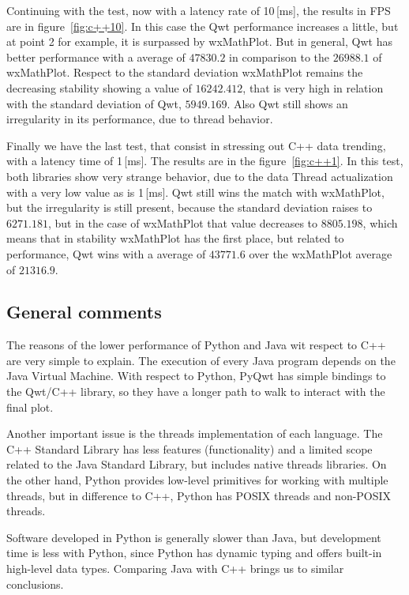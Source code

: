 Continuing with the test, now with a latency rate of 10\,[ms],
the results in FPS are in figure~\ref{fig:c++10}.
In this case the Qwt performance increases a little, but at
point 2 for example, it is surpassed by wxMathPlot. But in general,
Qwt has better performance with a average of $47830.2$ in
comparison to the $26988.1$ of wxMathPlot.
Respect to the standard deviation wxMathPlot remains the
decreasing stability showing a value of $16242.412$,
that is very high in relation with the standard deviation of
Qwt, $5949.169$. Also Qwt still shows an irregularity
in its performance, due to thread behavior.

Finally we have the last test, that consist in stressing out C++ data trending, with a latency time of 1\,[ms].
The results are in the figure~\ref{fig:c++1}.
In this test, both libraries show very strange behavior, due to the
data Thread actualization with a very low value as is 1\,[ms].
Qwt still wins the match with wxMathPlot, but the irregularity is still present,
because the standard deviation raises to $6271.181$, but in the case of wxMathPlot
that value decreases to $8805.198$, which means that in stability wxMathPlot has the
first place, but related to performance, Qwt wins with a average of $43771.6$
over the wxMathPlot average of $21316.9$.


\subsection{General comments}

The reasons of the lower performance of Python and Java wit respect to C++
are very simple to explain. The execution of every Java program depends on the
Java Virtual Machine.
With respect to Python, PyQwt has simple bindings to the Qwt/C++ library, so they
have a longer path to walk to interact with the final plot.

Another important issue is the threads implementation of each language.
The C++ Standard Library has less features (functionality) and a limited scope
related to the Java Standard Library, but includes native threads libraries.
On the other hand, Python provides low-level primitives for working with multiple threads,
but in difference to C++, Python has POSIX threads and non-POSIX threads.

Software developed in Python is generally slower than Java,
but development time is less with Python,
since Python has dynamic typing and offers built-in high-level data types.
Comparing Java with C++ brings us to similar conclusions.
